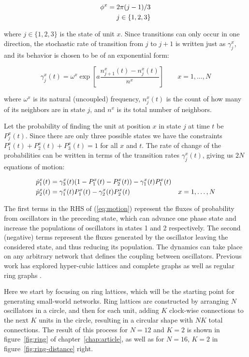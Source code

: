 \begin{align}
  \phi^x = 2\pi (j-1)/3 \\
  j \in \{1,2,3\} \notag
\end{align}

\noindent where $j\in\{1,2,3\}$ is the state of unit $x$. Since transitions can only occur in one direction, the stochastic rate of
transition from $j$ to $j+1$ is written just as $\gamma^x_j$, and its behavior is chosen to be of an exponential form:

\begin{equation}
  \gamma^x_j(t) = \omega^x\exp\left[ a\frac{n^x_{j+1}(t) - n^x_j(t)}{n^x} \right] \qquad x=1,\dots, N
  \label{eq:rate}
\end{equation}

\noindent where $\omega^x$ is its natural (uncoupled) frequency, $n^x_j(t)$ is the count of how many of its neighbors are in state $j$,
and $n^x$ is its total number of neighbors.

Let the probability of finding the unit at position $x$ in state $j$ at time $t$ be $P_j^x(t)$. Since there are only three possible
states we have the constraints $P_1^x(t)+P_2^x(t)+P_3^x(t)=1$ for all $x$ and $t$. The rate of change of the probabilities can be
written in terms of the transition rates $\gamma^x_j(t)$, giving us $2N$ equations of motion:

\begin{align}
  \dot{p}^x_1(t) &= \gamma^x_3(t)(1 - P_1^x(t) - P_2^x(t)) - \gamma^x_1(t) P_1^x(t) & \notag\\
  \dot{p}^x_2(t) &= \gamma^x_1(t)P_1^x(t) - \gamma^x_2(t) P_2^x(t) &x=1,\dots,N
  \label{eq:motion}
\end{align}

\noindent The first terms in the RHS of (\ref{eq:motion}) represent the fluxes of probability from oscillators in the preceding state,
which can advance one phase state and increase the populations of oscillators in states 1 and 2 respectively. The second (negative)
terms represent the fluxes generated by the oscillator leaving the considered state, and thus reducing its population. The dynamics can
take place on any arbitrary network that defines the coupling between oscillators. Previous work has explored hyper-cubic lattices and
complete graphs as well as regular ring graphs \cite{Wood06a,assis2011infinite,escaff2014arrays}.

Here we start by focusing on ring lattices, which will be the starting point for generating small-world networks. Ring lattices are
constructed by arranging $N$ oscillators in a circle, and then for each unit, adding $K$ clock-wise connections to the next $K$ units
in the circle, resulting in a circular shape with $NK$ total connections. The result of this process for $N=12$ and $K=2$ is shown in
figure~\ref{fig:ring} of chapter~\ref{chap:article}, as well as for $N=16$, $K=2$ in figure~\ref{fig:ring-distance} right.

